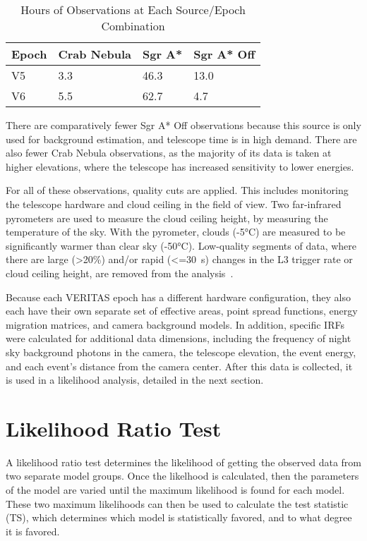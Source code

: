 \begin{table}[!ht]
  \centering
  \caption{Hours of Observations at Each Source/Epoch Combination}
  \label{tab:observation_times}
  \begin{tabular}{|l|l|l|l|}
    \hline
    \textbf{Epoch} & \textbf{Crab Nebula} & \textbf{Sgr A*} & \textbf{Sgr A* Off} \\ \hline
    V5             & 3.3                  & 46.3            & 13.0                \\ \hline
    V6             & 5.5                  & 62.7            & 4.7                 \\ \hline
  \end{tabular}
\end{table}


There are comparatively fewer Sgr A* Off observations because this source is only used for background estimation, and telescope time is in high demand.
There are also fewer Crab Nebula observations, as the majority of its data is taken at higher elevations, where the telescope has increased sensitivity to lower energies.

For all of these observations, quality cuts are applied.
This includes monitoring the telescope hardware and cloud ceiling in the field of view.
Two far-infrared pyrometers are used to measure the cloud ceiling height, by measuring the temperature of the sky.
With the pyrometer, clouds (\nicetilde\ang{-5}C) are measured to be significantly warmer than clear sky (\nicetilde\ang{-50}C).
Low-quality segments of data, where there are large (>20\%) and/or rapid (<=\SI{30}{s}) changes in the L3 trigger rate or cloud ceiling height, are removed from the analysis~\cite{bird_weather}.

Because each VERITAS epoch has a different hardware configuration, they also each have their own separate set of effective areas, point spread functions, energy migration matrices, and camera background models.
In addition, specific IRFs were calculated for additional data dimensions, including the frequency of night sky background photons in the camera, the telescope elevation, the event energy, and each event's distance from the camera center.
After this data is collected, it is used in a likelihood analysis, detailed in the next section.

\section{Likelihood Ratio Test}\label{sec:likeratio}
A likelihood ratio test determines the likelihood of getting the observed data from two separate model groups.
Once the likelhood is calculated, then the parameters of the model are varied until the maximum likelihood is found for each model.
These two maximum likelihoods can then be used to calculate the test statistic (TS), which determines which model is statistically favored, and to what degree it is favored.

